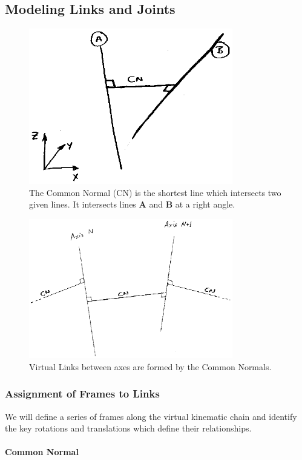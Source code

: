 \subsection{Modeling Links and Joints}


\begin{figure}
\includegraphics[width=3.5in]{figs03/00337.eps}
\caption{The Common Normal (CN) is the shortest line which intersects two given lines.  It intersects  lines {\bf A} and {\bf B}  at a right angle.}\label{CommonNormals}
\end{figure}


\begin{figure}
\includegraphics[width=3.5in]{figs03/00339.eps}
\caption{Virtual Links between axes are formed by the Common Normals.}\label{VirtualLinksCN}
\end{figure}

\subsubsection{Assignment of Frames to Links}
We will define a series of frames along the virtual kinematic chain and identify the key rotations and translations which define their relationships.


\paragraph{Common Normal}

